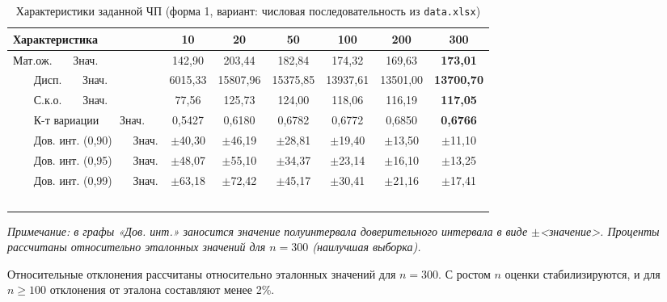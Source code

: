 \documentclass[a4paper,12pt]{article}
\begin{document}
\begin{table}[H]
\centering
\small
\caption{Характеристики заданной ЧП (форма 1, вариант: числовая последовательность из \texttt{data.xlsx})}
\label{tab:form1}
\begin{tabular}{l|cccccc}
\toprule
\textbf{Характеристика} & \textbf{10} & \textbf{20} & \textbf{50} & \textbf{100} & \textbf{200} & \textbf{300} \\
\midrule
Мат.ож. \ \ \ Знач. & 142,90 & 203,44 & 182,84 & 174,32 & 169,63 & \textbf{173,01} \\
\ \ \ %
Дисп. \ \ \ Знач. & 6015,33 & 15807,96 & 15375,85 & 13937,61 & 13501,00 & \textbf{13700,70} \\
\ \ \ %
С.к.о. \ \ \ Знач. & 77,56 & 125,73 & 124,00 & 118,06 & 116,19 & \textbf{117,05} \\
\ \ \ %
К-т вариации \ \ \ Знач. & 0,5427 & 0,6180 & 0,6782 & 0,6772 & 0,6850 & \textbf{0,6766} \\
\ \ \ %
\midrule
Дов. инт. (0,90) \ \ \ Знач. & $\pm$40,30 & $\pm$46,19 & $\pm$28,81 & $\pm$19,40 & $\pm$13,50 & $\pm$11,10 \\
\ \ \ %
Дов. инт. (0,95) \ \ \ Знач. & $\pm$48,07 & $\pm$55,10 & $\pm$34,37 & $\pm$23,14 & $\pm$16,10 & $\pm$13,25 \\
\ \ \ %
Дов. инт. (0,99) \ \ \ Знач. & $\pm$63,18 & $\pm$72,42 & $\pm$45,17 & $\pm$30,41 & $\pm$21,16 & $\pm$17,41 \\
\ \ \ %
\bottomrule
\end{tabular}
\end{table}

\textit{Примечание: в графы «Дов. инт.» заносится значение полуинтервала доверительного интервала в виде $\pm$<значение>. Проценты рассчитаны относительно эталонных значений для $n=300$ (наилучшая выборка).}

Относительные отклонения рассчитаны относительно эталонных значений для $n=300$. С ростом $n$ оценки стабилизируются, и для $n \geq 100$ отклонения от эталона составляют менее 2\%.
\end{document}
